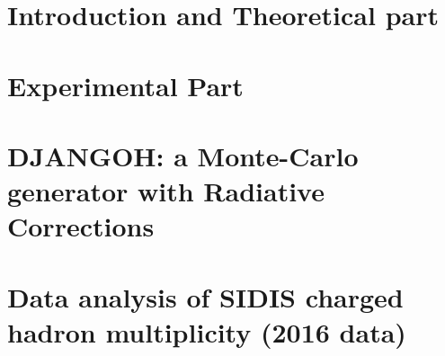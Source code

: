 \pagestyle{scrheadings}

\part{Introduction and Theoretical part} %


\cleardoublepage %


\part{Experimental Part} %


\cleardoublepage %


\part{DJANGOH: a Monte-Carlo generator with Radiative Corrections} %


\cleardoublepage %


\part{Data analysis of SIDIS charged hadron multiplicity (2016 data)} %


